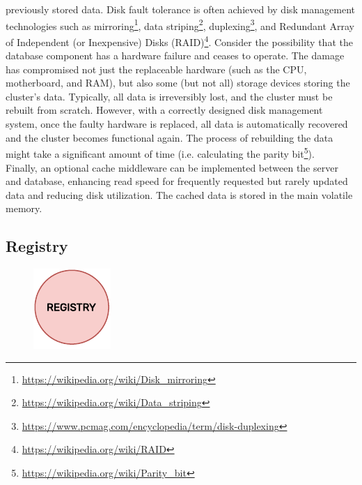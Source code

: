 previously stored data. Disk fault tolerance is often achieved by disk
management technologies such as mirroring\footnote{\url{https://wikipedia.org/wiki/Disk_mirroring}},
data striping\footnote{\url{https://wikipedia.org/wiki/Data_striping}},
duplexing\footnote{\url{https://www.pcmag.com/encyclopedia/term/disk-duplexing}},
and Redundant Array of Independent (or Inexpensive) Disks (RAID)\footnote{\url{https://wikipedia.org/wiki/RAID}}\cite{disk_management_technologies}.
Consider the possibility that the database component has a hardware failure and ceases
to operate. The damage has compromised not just the replaceable hardware (such as
the CPU, motherboard, and RAM), but also some (but not all) storage devices storing
the cluster's data. Typically, all data is irreversibly lost, and the cluster
must be rebuilt from scratch. However, with a correctly designed disk management
system, once the faulty hardware is replaced, all data is automatically
recovered and the cluster becomes functional again. The process of rebuilding the
data might take a significant amount of time (i.e. calculating the parity bit\footnote{\url{https://wikipedia.org/wiki/Parity_bit}}).
\\ %
Finally, an optional cache middleware can be implemented between the server and database,
enhancing read speed for frequently requested but rarely updated data and
reducing disk utilization. The cached data is stored in the main volatile memory.

\subsection{Registry}
\label{subsec:architecture_components_registry}

\begin{figure}
  \centering
  \includegraphics[width=\linewidth]{images/architecture/registry.pdf}
\end{figure}

